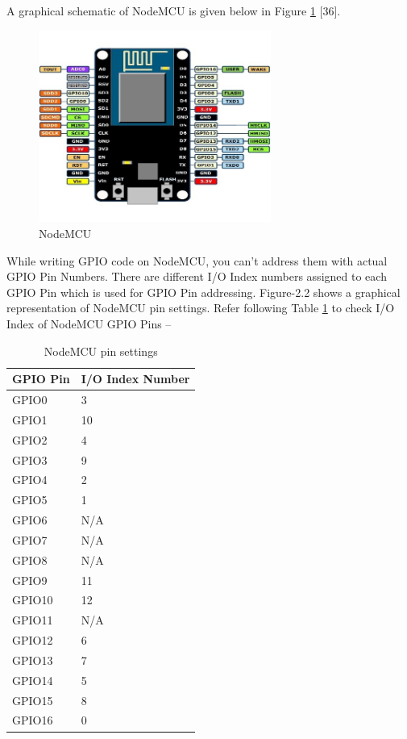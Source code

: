 A graphical schematic of NodeMCU is given below in Figure \ref{fig1} [36].

\begin{figure}[h]
  \centering
  \includegraphics[width=3in]{1}
  \caption{NodeMCU}\label{fig1}
\end{figure}

While writing GPIO code on NodeMCU, you can’t address them with actual GPIO Pin Numbers. There are different I/O Index numbers assigned to each GPIO Pin which is used for GPIO Pin addressing. Figure-2.2 shows a graphical representation of NodeMCU pin settings. Refer following Table \ref{tab1} to check I/O Index of NodeMCU GPIO Pins –

\begin{table}
  \caption{NodeMCU pin settings}\label{tab1}
  \centering
  \begin{tabular}{|p{1in}|p{1.5in}|}
    \hline
    \textbf{GPIO Pin} & I\textbf{/O Index Number}\\[2ex] \hline
    GPIO0 &  3\\[2ex] \hline
    GPIO1 &  10\\[2ex] \hline
    GPIO2 &  4\\[2ex] \hline
    GPIO3 &  9\\[2ex] \hline
    GPIO4 &  2\\[2ex] \hline
    GPIO5 &  1\\[2ex] \hline
    GPIO6 &  N/A\\[2ex] \hline
    GPIO7 &  N/A\\[2ex] \hline
    GPIO8 &  N/A\\[2ex] \hline
    GPIO9 &  11\\[2ex] \hline
    GPIO10 &  12\\[2ex] \hline
    GPIO11 &  N/A\\[2ex] \hline
    GPIO12 &  6\\[2ex] \hline
    GPIO13 &  7\\[2ex] \hline
    GPIO14 &  5\\[2ex] \hline
    GPIO15 &  8\\[2ex] \hline
    GPIO16 &  0\\[2ex] \hline
  \end{tabular}
\end{table}
\newpage

